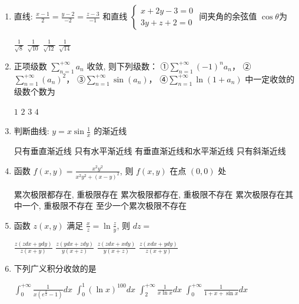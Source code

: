 \begin{enumerate}
\begin{enumerate}
\item 
直线: $\frac{x-1}{2}=\frac{y-2}{-2}=\frac{z-3}{-1}$ 和直线 $\left\{\begin{array}{l}x+2 y-3=0 \\ 3 y+z+2=0\end{array}\right.$ 间夹角的余弦值 $\cos \theta$为  



\fourchoices
{$\frac{1}{\sqrt{8}}$}
{$\frac{1}{\sqrt{10}}$}
{$\frac{1}{\sqrt{12}}$}
{$\frac{1}{\sqrt{14}}$}

\item 
正项级数 $\sum\limits_{n=1}^{+\infty} a_{n}$ 收敛, 则下列级数：
①$\sum\limits_{n=1}^{+\infty}(-1)^{n} a_{n}$，
②$\sum\limits_{n=1}^{+\infty}\left(a_{n}\right)^{2}$，
③$\sum\limits_{n=1}^{+\infty} \sin \left(a_{n}\right)$，
④$\sum\limits_{n=1}^{+\infty} \ln \left(1+a_{n}\right)$
中一定收敛的级数个数为  



\fourchoices
{$ 1 $}
{$ 2 $}
{$ 3 $}
{$ 4 $}


\item 
判断曲线: $y=x \sin \frac{1}{x}$ 的渐近线  

\fourchoices
{只有垂直渐近线}
{只有水平渐近线}
{有垂直渐近线和水平渐近线}
{只有斜渐近线}


\item 
函数 $f(x, y)=\frac{x^{2} y^{2}}{x^{2} y^{2}+(x-y)^{2}}$, 则 $f(x, y)$ 在点 $(0,0)$ 处  

\fourchoices
{累次极限都存在, 重极限存在}
{累次极限都存在, 重极限不存在}
{累次极限存在其中一个, 重极限不存在}
{至少一个累次极限不存在}

\item 
函数 $z(x, y)$ 满足 $\frac{x}{z}=\ln \frac{z}{y}$, 则 $d z=$  

\fourchoices
{$\frac{z(z d x+y d y)}{z(x+y)}$}
{$\frac{z(y d x+z d y)}{y(x+z)}$}
{$ \frac{z(z d x+x d y)}{y(x+z)}$}
{$\frac{z(x d x+y d y)}{z(x+y)}$}

\item 
下列广义积分收敛的是  


\fourchoices
{$\int_{0}^{+\infty} \frac{1}{x\left(e^{\frac{x}{2}}-1\right)} d x$}
{$\int_{0}^{1}(\ln x)^{100} d x$}
{$ \int_{2}^{+\infty} \frac{1}{x \ln x} d x$}
{$\int_{0}^{+\infty} \frac{1}{1+x+\sin x} d x$}







\end{enumerate}



\end{enumerate}
